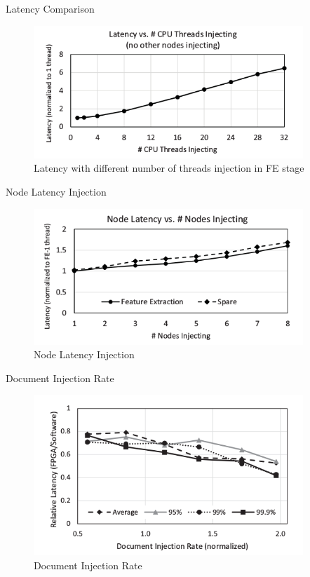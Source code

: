 \documentclass[t]{beamer}
\begin{document}
\begin{frame}{Latency Comparison}
    \begin{figure}
        \includegraphics[width=4in]{img/latency-cpu-fe.png}
        \caption{Latency with different number of threads injection in FE stage}
    \end{figure}
\end{frame}

\begin{frame}{Node Latency Injection}
    \begin{figure}
        \includegraphics[width=4in]{img/node-latency-injection.png}
        \caption{Node Latency Injection}
    \end{figure}
\end{frame}

\begin{frame}{Document Injection Rate}
    \begin{figure}
        \includegraphics[width=4in]{img/document-injection-rate.png}
        \caption{Document Injection Rate}
    \end{figure}
\end{frame}
\end{document}
